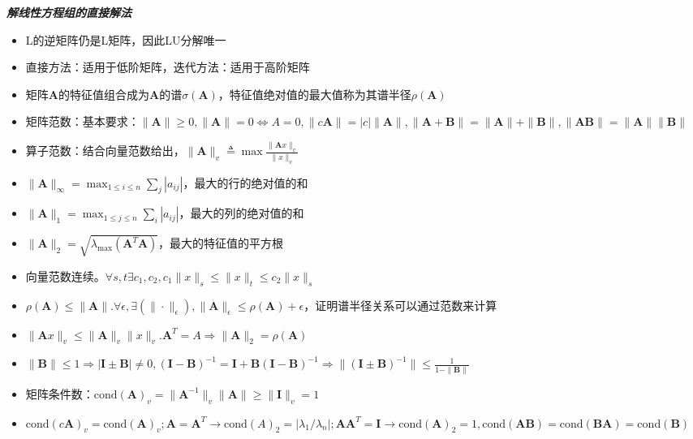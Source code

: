 \documentclass[UTF8,a4paper,landscape,compress]{paper}
\renewcommand{\section}[1]{{\normalsize\textbf{\emph{#1}}}\\ }
\newcommand{\List}[1]{\begin{itemize}[fullwidth,itemindent=0em] #1 \end{itemize}}
\begin{document}
\begin{multicols}{4}
\section{解线性方程组的直接解法}
    \List{
        \item {L的逆矩阵仍是L矩阵，因此LU分解唯一}
		\item {直接方法：适用于低阶矩阵，迭代方法：适用于高阶矩阵}
        \item {矩阵$\bm{A}$的特征值组合成为$\bm{A}$的谱$\sigma(\bm{A})$，特征值绝对值的最大值称为其谱半径$\rho(\bm{A})$}
        \item {矩阵范数：基本要求：$\|\bm A\|\ge 0,\|\bm A\| = 0 \iff A = 0,\|c\bm A\| = |c|\|\bm A\|, \|\bm A + \bm B \| = \|\bm A\| + \| \bm B\|, \|\bm A\bm B\| = \|\bm A\|\|\bm B\|$}
        \item {算子范数：结合向量范数给出，$\|\bm A\|_v \triangleq \max \frac {\|\bm A x\|_v}{\|x\|_v}$}
        \item {$\|\bm A\|_\infty= \max_{1\le i \le n}\sum_j|a_{ij}|$，最大的行的绝对值的和}
        \item {$\|\bm A\|_1= \max_{1\le j \le n}\sum_i|a_{ij}|$，最大的列的绝对值的和}
        \item {$\|\bm A\|_2= \sqrt{\lambda_{\max}(\bm A^T\bm A)}$，最大的特征值的平方根}
        \item {向量范数连续。$\forall s,t \exists c_1,c_2, c_1\|x\|_s \le \|x\|_t \le c_2\|x\|_s$}
        \item {$\rho(\bm A) \le \|\bm A\|. \forall \epsilon, \exists (\|\cdot\|_{\epsilon}), \|\bm A\|_{\epsilon} \le \rho(\bm A) + \epsilon$，证明谱半径关系可以通过范数来计算}
        \item {$\|\bm Ax\|_v \le \|\bm A\|_v\|x\|_v.\bm A^T = A\Rightarrow \|\bm A\|_2 = \rho(\bm A)$}
        \item {$\|\bm B\| \le 1 \Rightarrow |\bm I\pm \bm B| \ne 0, (\bm I - \bm B)^{-1} = \bm I + \bm B(\bm I - \bm B)^{-1} \Rightarrow \|(\bm I \pm \bm B)^{-1}\| \le \frac 1{1-\|\bm B\|}$}
        \item {矩阵条件数：$\mathrm{cond}(\bm A)_v = \|\bm A^{-1}\|_v\|\bm A\| \ge \|\bm I\|_v = 1$}
        \item {$\mathrm{cond}(c\bm A)_v = \mathrm{cond}(\bm A)_v; \bm A = \bm A^T \rightarrow \mathrm{cond}(A)_2=|\lambda_1/\lambda_n|;\bm A\bm A^T = \bm I \rightarrow \mathrm{cond}(\bm A)_2 = 1,\mathrm{cond}(\bm A \bm B)=\mathrm{cond}(\bm B \bm A) = \mathrm{cond}(\bm B) $}
    }

\end{multicols}
\end{document}
